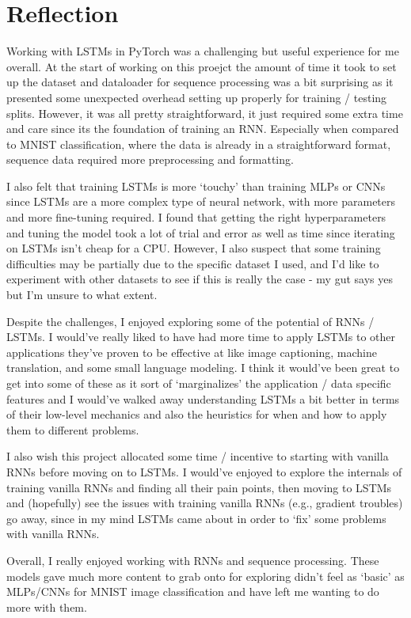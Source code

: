 \documentclass[12pt, twoside]{report}
\begin{document}
\chapter{Reflection}

Working with LSTMs in PyTorch was a challenging but useful experience for me overall.
At the start of working on this proejct the amount of time it took to set up the dataset and dataloader
for sequence processing was a bit surprising as it presented some unexpected overhead setting up properly
for training / testing splits. However, it was all pretty straightforward, it just required some extra time and care
since its the foundation of training an RNN.
Especially when compared to MNIST classification, where the data is already in a straightforward format,
sequence data required more preprocessing and formatting.

I also felt that training LSTMs is more `touchy' than training MLPs or CNNs
since LSTMs are a more complex type of neural network, with more parameters and more fine-tuning required.
I found that getting the right hyperparameters and tuning the model took a lot of trial and error as well as time
since iterating on LSTMs isn't cheap for a CPU.
However, I also suspect that some training difficulties may be partially due to the specific dataset I used, 
and I'd like to experiment with other datasets to see if this is really the case - my gut says yes but 
I'm unsure to what extent.

Despite the challenges, I enjoyed exploring some of the potential of RNNs / LSTMs.
I would've really liked to have had more time to apply LSTMs to other applications they've proven to be effective at like
image captioning, machine translation, and some small language modeling.
I think it would've been great to get into some of these as it sort of `marginalizes' the application / data specific 
features and I would've walked away understanding LSTMs a bit better in terms of their low-level mechanics and also
the heuristics for when and how to apply them to different problems.

I also wish this project allocated some time / incentive to starting with vanilla RNNs before moving on to LSTMs.
I would've enjoyed to explore the internals of training vanilla RNNs and finding all their pain points, then moving
to LSTMs and (hopefully) see the issues with training vanilla RNNs (e.g., gradient troubles) go away, since in my mind
LSTMs came about in order to `fix' some problems with vanilla RNNs.

Overall, I really enjoyed working with RNNs and sequence processing. These models gave much more content to grab
onto for exploring didn't feel as `basic' as MLPs/CNNs for MNIST image classification and have left me wanting to do
more with them.



\end{document}
